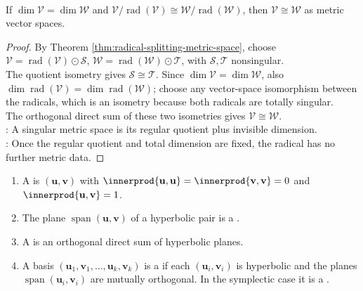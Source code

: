 \begin{corollary} \label{cor:metric-spaces-determined-by-regular-quotient-and-dimension} \\
If $\dim\mathcal{V}=\dim\mathcal{W}$ and $\mathcal{V}/\operatorname{rad}(\mathcal{V}) \cong \mathcal{W}/\operatorname{rad}(\mathcal{W})$, then $\mathcal{V}\cong\mathcal{W}$ as metric vector spaces.
\begin{proof}
By Theorem \ref{thm:radical-splitting-metric-space}, choose $\mathcal{V}=\operatorname{rad}(\mathcal{V})\odot\mathcal{S}$, $\mathcal{W}=\operatorname{rad}(\mathcal{W})\odot\mathcal{T}$, with $\mathcal{S},\mathcal{T}$ nonsingular.\\
The quotient isometry gives $\mathcal{S}\cong\mathcal{T}$. Since $\dim\mathcal{V}=\dim\mathcal{W}$, also $\dim\operatorname{rad}(\mathcal{V})=\dim\operatorname{rad}(\mathcal{W})$; choose any vector-space isomorphism between the radicals, which is an isometry because both radicals are totally singular.\\
The orthogonal direct sum of these two isometries gives $\mathcal{V}\cong\mathcal{W}$.\\
: A singular metric space is its regular quotient plus invisible dimension.\\
: Once the regular quotient and total dimension are fixed, the radical has no further metric data.
\end{proof}
\end{corollary}

\begin{definition} \label{def:hyperbolic-pairs-and-spaces} 
\begin{enumerate}[label=(\roman*)]
\setlength{\itemsep}{0pt}
\item A  is $(\mathbf{u},\mathbf{v})$ with $\innerprod{\mathbf{u},\mathbf{u}}=\innerprod{\mathbf{v},\mathbf{v}}=0$ and $\innerprod{\mathbf{u},\mathbf{v}}=1$.
\item The plane $\operatorname{span}(\mathbf{u},\mathbf{v})$ of a hyperbolic pair is a .
\item A  is an orthogonal direct sum of hyperbolic planes.
\item A basis $(\mathbf{u}_1,\mathbf{v}_1,\ldots,\mathbf{u}_k,\mathbf{v}_k)$ is a  if each $(\mathbf{u}_i,\mathbf{v}_i)$ is hyperbolic and the planes $\operatorname{span}(\mathbf{u}_i,\mathbf{v}_i)$ are mutually orthogonal. In the symplectic case it is a .
\end{enumerate}
\end{definition}

